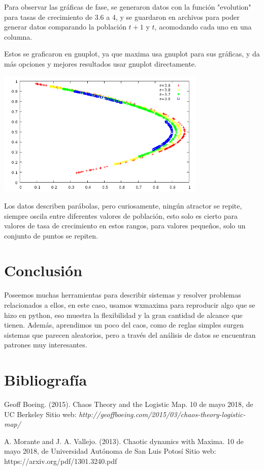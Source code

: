 \documentclass[a4paper]{article}
\begin{document}
Para observar las gráficas de fase, se generaron datos con la función "evolution" para tasas de crecimiento de 3.6 a 4, y se guardaron en archivos para poder generar datos comparando la población $t+1$ y $t$, acomodando cada uno en una columna. 

Estos se graficaron en gnuplot, ya que maxima usa gnuplot para sus gráficas, y da más opciones y mejores resultados usar gnuplot directamente.

\begin{center}
\includegraphics[height=6cm]{Grafica_Compilacion_2.png}
\end{center}

Los datos describen parábolas, pero curiosamente, ningún atractor se repite, siempre oscila entre diferentes valores de población, esto solo es cierto para valores de tasa de crecimiento en estos rangos, para valores pequeños, solo un conjunto de puntos se repiten.


\section{Conclusión}

Poseemos muchas herramientas para describir sistemas y resolver problemas relacionados a ellos, en este caso, usamos wxmaxima para reproducir algo que se hizo en python, eso muestra la flexibilidad y la gran cantidad de alcance que tienen. Además, aprendimos un poco del caos, como de reglas simples surgen sistemas que parecen aleatorios, pero a través del análisis de datos se encuentran patrones muy interesantes.

\section{Bibliografía}

Geoff Boeing. (2015). Chaos Theory and the Logistic Map. 10 de mayo 2018, de UC Berkeley Sitio web: \textit{http://geoffboeing.com/2015/03/chaos-theory-logistic-map/}

A. Morante and J. A. Vallejo. (2013). Chaotic dynamics with Maxima. 10 de mayo 2018, de Universidad Autónoma de San Luis Potosí Sitio web: https://arxiv.org/pdf/1301.3240.pdf
\end{document}
